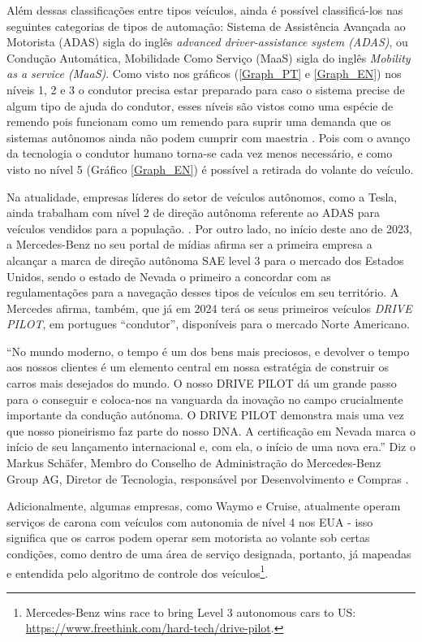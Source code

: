 Além dessas classificações entre tipos veículos, ainda é possível classificá-los nas seguintes categorias de tipos de automação: Sistema de Assistência Avançada ao Motorista (ADAS) sigla do inglês \textit{advanced driver-assistance system (ADAS)}, ou Condução Automática, Mobilidade Como Serviço (MaaS) sigla do inglês \textit{Mobility as a service (MaaS)}.
Como visto nos gráficos (\ref{Graph_PT} e \ref{Graph_EN}) nos níveis 1, 2 e 3 o condutor precisa estar preparado para caso o sistema precise de algum tipo de ajuda do condutor, esses níveis são vistos como uma espécie de remendo pois funcionam como um remendo para suprir uma demanda que os sistemas autônomos ainda não podem cumprir com maestria \cite{4cenarios_ocidental}. Pois com o avanço da tecnologia o condutor humano torna-se cada vez menos necessário, e como visto no nível 5 (Gráfico \ref{Graph_EN}) é possível a retirada do volante do veículo. 

Na atualidade, empresas líderes do setor de veículos autônomos, como a Tesla, ainda trabalham com nível 2 de direção autônoma referente ao ADAS para veículos vendidos para a população. \cite{4cenarios_ocidental}.
Por outro lado, no início deste ano de 2023, a Mercedes-Benz no seu portal de mídias afirma ser a primeira empresa a alcançar a marca de direção autônoma SAE level 3 para o mercado dos Estados Unidos, sendo o estado de Nevada o primeiro a concordar com as regulamentações para a navegação desses tipos de veículos em seu território. A Mercedes afirma, também, que já em 2024 terá os seus primeiros veículos \textit{DRIVE PILOT}, em portugues “condutor”, disponíveis para o mercado Norte Americano.

“No mundo moderno, o tempo é um dos bens mais preciosos, e devolver o tempo aos nossos clientes é um elemento central em nossa estratégia de construir os carros mais desejados do mundo. O nosso DRIVE PILOT dá um grande passo para o conseguir e coloca-nos na vanguarda da inovação no campo crucialmente importante da condução autónoma. O DRIVE PILOT demonstra mais uma vez que nosso pioneirismo faz parte do nosso DNA. A certificação em Nevada marca o início de seu lançamento internacional e, com ela, o início de uma nova era.” Diz o Markus Schäfer, Membro do Conselho de Administração do Mercedes‑Benz Group AG, Diretor de Tecnologia, responsável por Desenvolvimento e Compras \cite{mercedes3}.

Adicionalmente, algumas empresas, como Waymo e Cruise, atualmente operam serviços de carona com veículos com autonomia de nível 4 nos EUA - isso significa que os carros podem operar sem motorista ao volante sob certas condições, como dentro de uma área de serviço designada, portanto, já mapeadas e entendida pelo algoritmo de controle dos veículos\footnote{Mercedes-Benz wins race to bring Level 3 autonomous cars to US: \url{https://www.freethink.com/hard-tech/drive-pilot}.}.



